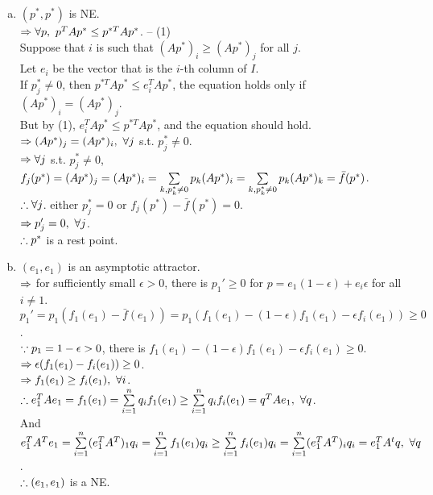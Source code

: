 \begin{pr}$ $
\begin{enumerate}[(a)]
\item $(p^*, p^*)$ is NE.\\
$\Rightarrow\forall p,\ p^TAp^*\leq p^{*T}Ap^*$. -- (1)\\
Suppose that $i$ is such that $(Ap^*)_i\geq(Ap^*)_j$ for all $j$.\\
Let $e_i$ be the vector that is the $i$-th column of $I$.\\
If $p^*_j\neq0$, then $p^{*T}Ap^*\leq e_i^TAp^*$, the equation holds only if $(Ap^*)_i=(Ap^*)_j$.\\
But by (1), $e_i^TAp^*\leq p^{*T}Ap^*$, and the equation should hold.\\
$\Rightarrow(Ap^*)_j=(Ap^*)_i,\ \forall j$ s.t. $p^*_j\neq0$.\\
$\Rightarrow\forall j$ s.t. $p^*_j\neq0$, $f_j(p^*)=(Ap^*)_j=(Ap^*)_i=\sum\limits_{k, p^*_k\neq0}p_k(Ap^*)_i=\sum\limits_{k, p^*_k\neq0}p_k(Ap^*)_k=\bar f(p^*)$.\\
$\therefore\forall j$. either $p^*_j=0$ or $f_j(p^*)-\bar f(p^*)=0$.\\
$\Rightarrow p'_j=0,\ \forall j$.\\
$\therefore p^*$ is a rest point.
\item $(e_1, e_1)$ is an asymptotic attractor.\\
$\Rightarrow$ for sufficiently small $\epsilon>0$, there is $p_1'\geq0$ for $p=e_1(1-\epsilon)+e_i\epsilon$ for all $i\neq1$.\\
$p_1'=p_1(f_1(e_1)-\bar f(e_1))=p_1(f_1(e_1)-(1-\epsilon)f_1(e_1)-\epsilon f_i(e_1))\geq0$.\\
$\because p_1=1-\epsilon>0$, there is $f_1(e_1)-(1-\epsilon)f_1(e_1)-\epsilon f_i(e_1)\geq0$.\\
$\Rightarrow\epsilon(f_1(e_1)-f_i(e_1))\geq0$.\\
$\Rightarrow f_1(e_1)\geq f_i(e_1),\ \forall i$.\\
$\so e_1^TAe_1=f_1(e_1)=\suml_{i=1}^nq_if_1(e_1)\geq\suml_{i=1}^nq_if_i(e_1)=q^TAe_1,\ \forall q$.\\
And $e_1^TA^Te_1=\suml_{i=1}^n(e_1^TA^T)_1q_i=\suml_{i=1}^nf_1(e_1)q_i\geq\suml_{i=1}^nf_i(e_1)q_i=\suml_{i=1}^n(e_1^TA^T)_iq_i=e_1^TA^tq,\ \forall q$.\\
$\therefore(e_1, e_1)$ is a NE.
\end{enumerate}
\end{pr}
